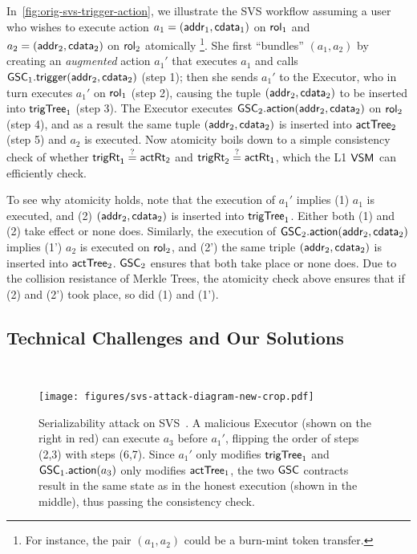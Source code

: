 \label{svs-crt-lifecycle} 
In~\cref{fig:orig-svs-trigger-action}, we illustrate the SVS workflow assuming a user who wishes to execute action $a_1 = (\mathsf{addr}_{1}, \mathsf{cdata}_{1})$ on $\mathsf{rol}_{1}$ and $a_2 = (\mathsf{addr}_{2}, \mathsf{cdata}_{2})$ on $\mathsf{rol}_{2}$ atomically \footnote{For instance, the pair $(a_1,a_2)$ could be a burn-mint token transfer.}.
She first ``bundles'' $(a_1,a_2)$ by creating an \emph{augmented} action $a_1'$ that executes $a_1$ and calls $\mathsf{GSC}_1.\mathsf{trigger}(\mathsf{addr}_{2}, \mathsf{cdata}_{2})$ (step 1); then she sends $a_1'$ to the Executor, who in turn executes $a_1'$ on $\mathsf{rol}_{1}$ (step 2), causing the tuple $(\mathsf{addr}_{2}, \mathsf{cdata}_{2})$ to be inserted into $\mathsf{trigTree}_1$ (step 3). The Executor executes $\mathsf{GSC}_2.\mathsf{action}(\mathsf{addr}_{2}, \mathsf{cdata}_{2})$ on $\mathsf{rol}_{2}$ (step 4), and as a result the same tuple $(\mathsf{addr}_{2}, \mathsf{cdata}_{2})$ is inserted into $\mathsf{actTree}_2$ (step 5) and $a_2$ is executed.
Now atomicity boils down to a simple consistency check of whether $\mathsf{trigRt}_{\mathsf{1}} \overset{?}{=} \mathsf{actRt}_{\mathsf{2}}$ and $\mathsf{trigRt}_{\mathsf{2}} \overset{?}{=} \mathsf{actRt}_{\mathsf{1}}$, which the L1 $\mathsf{VSM}_{}$ can efficiently check.

To see why atomicity holds, note that the execution of $a_1'$ implies (1) $a_1$ is executed, and (2) $(\mathsf{addr}_{2}, \mathsf{cdata}_{2})$ is inserted into $\mathsf{trigTree}_1$. Either both (1) and (2) take effect or none does. Similarly, the execution of $\mathsf{GSC}_2.\mathsf{action}(\mathsf{addr}_{2}, \mathsf{cdata}_{2})$ implies (1') $a_2$ is executed on $\mathsf{rol}_{2}$, and (2') the same triple $(\mathsf{addr}_{2}, \mathsf{cdata}_{2})$ is inserted into $\mathsf{actTree}_2$. $\mathsf{GSC}_2$ ensures that both take place or none does.
Due to the collision resistance of Merkle Trees, the atomicity check above ensures that if (2) and (2') took place, so did (1) and (1').

\subsection{Technical Challenges and Our Solutions}~\label{sec:svs-challenges-and-solutions}



\begin{figure*}
    \centering
    \texttt{[image: figures/svs-attack-diagram-new-crop.pdf]}
    \caption{Serializability attack on SVS~\cite{shared-val-seq-23}. A malicious Executor (shown on the right in red) can execute $a_3$ before $a_1'$, flipping the order of steps (2,3) with steps (6,7). Since $a_1'$ only modifies $\mathsf{trigTree}_1$ and $\mathsf{GSC}_1.\mathsf{action}(a_3)$ only modifies $\mathsf{actTree}_1$, the two $\mathsf{GSC}$ contracts result in the same state as in the honest execution (shown in the middle), thus passing the consistency check.}
    \label{fig:svs-serializability-attack}
\end{figure*}

